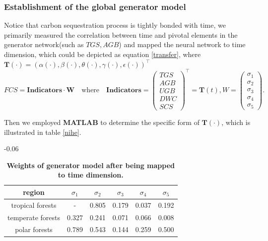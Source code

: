\documentclass[12pt]{article}
\begin{document}
\subsubsection{Establishment of the global generator model}
\hspace{2em} Notice that carbon sequestration process is tightly bonded with time, we primarily measured the correlation between time and pivotal elements in the generator network(such as $TGS, AGB$) and mapped the neural network to time dimension, which could be depicted as equation \ref{transfer}, where $\textbf{T}(\cdot)=(\alpha(\cdot),\beta(\cdot),\theta(\cdot),\gamma(\cdot),\epsilon(\cdot))^{\top}$ 
\begin{equation}
	FCS = \textbf{Indicators}\cdot\textbf{W}\hspace{1em} 
	\text{where}\hspace{1em}\textbf{Indicators} = 
	{\begin{pmatrix}
		TGS \\ AGB \\ UGB \\ DWC \\ SCS
	\end{pmatrix}}^{\top}=\textbf{T}(t), 
	W=\begin{pmatrix}
		\sigma_1 \\ \sigma_2 \\ \sigma_3 \\ \sigma_4 \\ \sigma_5 
	\end{pmatrix}.
	\label{transfer}
\end{equation}

Then we employed \textbf{MATLAB} to determine the specific form of $\textbf{T}(\cdot)$, which is illustrated in table \ref{nihe}.
\begin{table}[h]
	\centering
	\setlength{\tabcolsep}{25pt}
	\begin{adjustwidth}{-0.06\textwidth}{}
	\begin{tabular}{cccccc}
		\toprule[2pt]
		region & $\sigma_1$ & $\sigma_2$ & $\sigma_3$ & $\sigma_4$ & $\sigma_5$ \\
		\midrule[1pt]
		tropical forests & - & 0.805 & 0.179 & 0.037 & 0.192 \\
		temperate forests & 0.327 & 0.241 & 0.071 & 0.066 & 0.008 \\
		polar forests & 0.789 & 0.543 & 0.144 & 0.259 & 0.500 \\
		\bottomrule[2pt]
	\end{tabular}
	\end{adjustwidth}
	\caption{\textbf{Weights of generator model after being mapped to time dimension.}}
\end{table}
\end{document}
